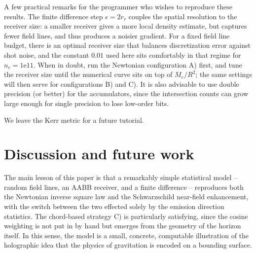 \documentclass[10pt]{article}
\begin{document}
A few practical remarks for the programmer who wishes to reproduce these results.
The finite difference step $\epsilon = 2 r_r$ couples the spatial resolution to the receiver size: a smaller receiver gives a more local density estimate, but captures fewer field lines, and thus produces a noisier gradient.
For a fixed field line budget, there is an optimal receiver size that balances discretization error against shot noise, and the constant $0.01$ used here sits comfortably in that regime for $n_e = 1\mathrm{e}11$.
When in doubt, run the Newtonian configuration A) first, and tune the receiver size until the numerical curve sits on top of $M_e / R^2$; the same settings will then serve for configurations B) and C).
It is also advisable to use double precision (or better) for the accumulators, since the intersection counts can grow large enough for single precision to lose low-order bits.

We leave the Kerr metric for a future tutorial.




\section{Discussion and future work}
\label{sec:discussion}

The main lesson of this paper is that a remarkably simple statistical model -- random field lines, an AABB receiver, and a finite difference -- reproduces both the Newtonian inverse square law and the Schwarzschild near-field enhancement, with the switch between the two effected solely by the emission direction statistics.
The chord-based strategy C) is particularly satisfying, since the cosine weighting is not put in by hand but emerges from the geometry of the horizon itself.
In this sense, the model is a small, concrete, computable illustration of the holographic idea that the physics of gravitation is encoded on a bounding surface.
\end{document}
